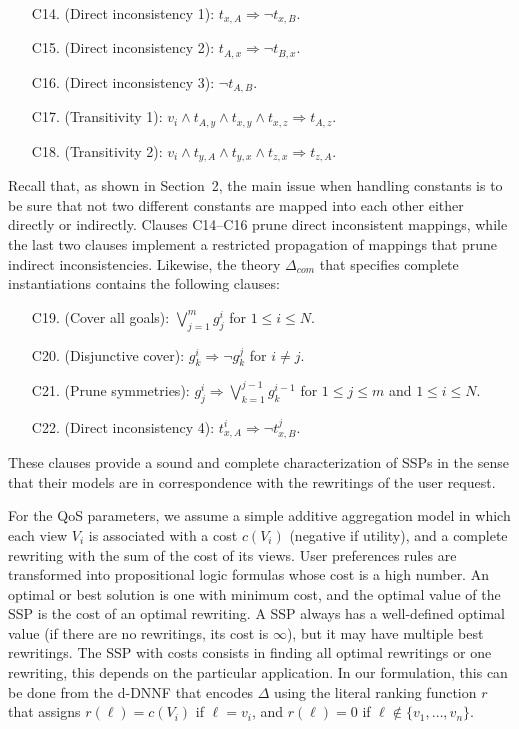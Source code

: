 \documentclass{llncs}
\begin{document}
{\begin{enumerate}[C10.]
\item[C14.] (Direct inconsistency 1): $t_{x,A} \Rightarrow \neg t_{x,B}$.
\item[C15.] (Direct inconsistency 2): $t_{A,x} \Rightarrow \neg t_{B,x}$.
\item[C16.] (Direct inconsistency 3): $\neg t_{A,B}$.
\item[C17.] (Transitivity 1): $v_i\land t_{A,y}\land t_{x,y}\land t_{x,z}\Rightarrow t_{A,z}$.
\item[C18.] (Transitivity 2): $v_i\land t_{y,A}\land t_{y,x}\land t_{z,x}\Rightarrow t_{z,A}$.
\end{enumerate}
Recall that, as shown in Section~2, the main issue when handling
constants is to be sure that not two different constants are mapped
into each other either directly or indirectly.
Clauses C14--C16 prune direct inconsistent mappings, while the last
two clauses implement a restricted propagation of mappings that prune
indirect inconsistencies.
Likewise, the theory $\Delta_{com}$ that specifies complete
instantiations contains the following clauses:
\begin{enumerate}[C10.]
\item[C19.] (Cover all goals): $\bigvee_{j=1}^m g^i_j$ for $1\leq i\leq N$.
\item[C20.] (Disjunctive cover): $g^i_k \Rightarrow \neg g^j_k$ for $i\neq j$.
\item[C21.] (Prune symmetries): $g^i_j \Rightarrow \bigvee_{k=1}^{j-1} g^{i-1}_k$
            for $1\leq j\leq m$ and $1\leq i\leq N$.
\item[C22.] (Direct inconsistency 4): $t^i_{x,A} \Rightarrow \neg t^j_{x,B}$.
\end{enumerate}
These clauses provide a sound and complete characterization of SSPs in the
sense that their models are in correspondence with the rewritings of the user request.

For the QoS parameters, we assume a simple additive aggregation model in
which each view $V_i$ is associated with a cost $c(V_i)$ (negative if utility),
and a complete rewriting with the sum of the cost of its views. User preferences rules are transformed into propositional logic formulas whose cost is a high number.
An optimal or best solution is one with minimum cost, and the
optimal value of the SSP is the cost of an optimal rewriting.
A SSP always has a well-defined optimal value (if there are no rewritings,
its cost is $\infty$), but it may have multiple best rewritings.
The SSP with costs consists in finding all optimal rewritings or
one rewriting, this depends on the particular application.
In our formulation, this can be done from the d-DNNF that encodes $\Delta$
using the literal ranking function $r$ that assigns $r(\ell)=c(V_i)$ if
$\ell=v_i$, and $r(\ell)=0$ if $\ell\notin\{v_1,\ldots,v_n\}$.
}
\end{document}
